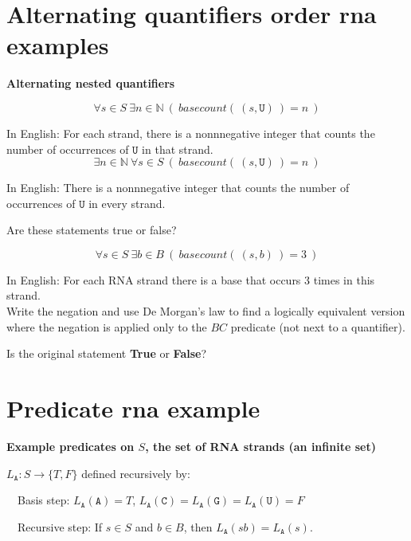 \documentclass[12pt, oneside]{article}
\newcommand{\A}[0]{\texttt{A}}
\newcommand{\C}[0]{\texttt{C}}
\newcommand{\G}[0]{\texttt{G}}
\newcommand{\U}[0]{\texttt{U}}
\begin{document}
\begin{flushright}
\end{flushright} \section*{Alternating quantifiers order rna examples}


{\bf Alternating nested quantifiers}



$$\forall s \in S ~\exists n \in \mathbb{N} ~(~basecount(~(s,\U)~) = n~)$$

In English: For each strand, there is a nonnnegative integer that counts the number of occurrences of $\U$ in that 
strand.\\

$$\exists n \in \mathbb{N} ~\forall s \in S ~(~basecount(~(s,\U)~) = n~)$$

In English: There is a nonnnegative integer that counts the number of occurrences of $\U$ in every 
strand.\\

\vfill

Are these statements true or false?

\newpage

$$\forall s \in S ~\exists b\in B ~(~basecount(~(s,b)~) = 3~)$$

In English: For each RNA strand there is a base that occurs 3 times in this strand.\\

Write the negation and use De Morgan's law to find a 
logically equivalent version where the negation is applied only to the 
$BC$ predicate (not next to a quantifier).

\vspace{60pt}


Is the original statement {\bf True} or {\bf False}?

\vfill
 \vfill
\section*{Predicate rna example}


{\bf Example predicates on $S$, the set of RNA strands (an infinite set)}


$L_{\A}: S \to \{T, F\}$  defined recursively by: 

~~Basis step: $L_{\A}(\A) = T$, $L_{\A}(\C) = L_{\A}(\G) = L_{\A}(\U) = F$

~~Recursive step: If $s \in S$ and $b \in B$, then $L_{\A}(sb) = L_{\A}(s)$.
\end{document}
